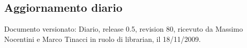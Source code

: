 \subsection{Aggiornamento diario}
Documento versionato: Diario, release 0.5, revision 80, ricevuto da Massimo 
Nocentini e Marco Tinacci in ruolo di librarian, il 18/11/2009. 